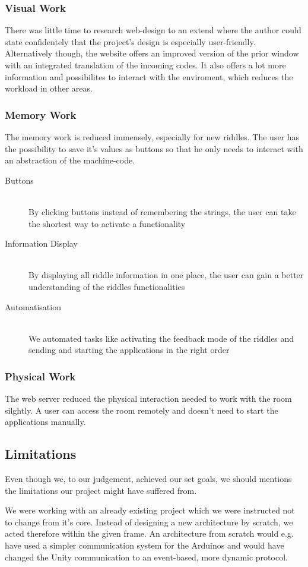 \subsubsection{Visual Work}
There was little time to research web-design to an extend where the author could state confidentely that the project's design is especially user-friendly.
Alternatively though, the website offers an improved version of the prior window with an integrated translation of the incoming codes.
It also offers a lot more information and possibilites to interact with the enviroment, which reduces the workload in other areas.
\subsubsection{Memory Work}
The memory work is reduced immensely, especially for new riddles. 
The user has the possibility to save it's values as buttons so that he only needs to interact with an abstraction of the machine-code.
\begin{description}
    \item [Buttons] \hfill \\
    By clicking buttons instead of remembering the strings, the user can take the shortest way to activate a functionality
    \item [Information Display] \hfill \\
    By displaying all riddle information in one place, the user can gain a better understanding of the riddles functionalities
    \item [Automatisation] \hfill \\
    We automated tasks like activating the feedback mode of the riddles and sending 
    and starting the applications in the right order
\end{description}
\subsubsection{Physical Work}
The web server reduced the physical interaction needed to work with the room  silghtly. 
A user can access the room remotely and doesn't need to start the applications manually.
\subsection{Limitations}
Even though we, to our judgement, achieved our set goals, 
we should mentions the limitations our project might have suffered from.

We were working with an already existing project which we were instructed not to change from it's core. 
Instead of designing a new architecture by scratch, we acted therefore within the given frame. 
An architecture from scratch would e.g. have used a simpler communication system for the Arduinos and would have changed 
the Unity communication to an event-based, more dynamic protocol.  

